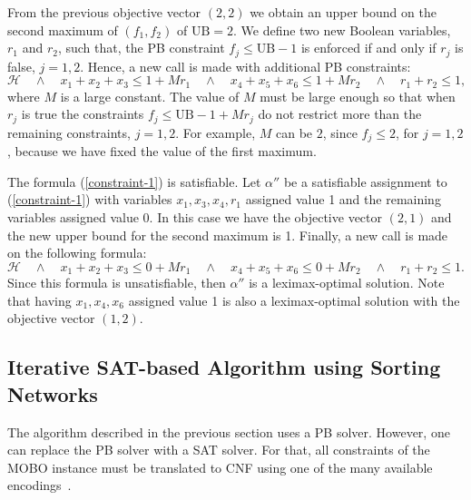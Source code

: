 \documentclass[a4paper,UKenglish,cleveref, autoref, thm-restate]{lipics-v2021}
\newcommand{\UB}{\text{UB}}
\begin{document}
\begin{example}
\begin{equation*}
\end{equation*}
From the previous objective vector $(2,2)$ we obtain an upper bound on the second maximum of $(f_1,f_2)$ of $\UB = 2$.
We define two new Boolean variables, $r_1$ and $r_2$, such that, the PB constraint $f_j \leq \UB - 1$ is enforced if and only if $r_j$ is false, $j=1,2$.
Hence, a new call is made with additional PB constraints:
\begin{equation}
    \mathcal{H} \quad \wedge \quad
    x_1 + x_2 + x_3 \leq 1 + M r_1 \quad \wedge \quad
    x_4 + x_5 + x_6 \leq 1 + M r_2 \quad \wedge \quad
    r_1 + r_2 \leq 1, \label{constraint-1}
\end{equation}
where $M$ is a large constant.
The value of $M$ must be large enough so that when $r_j$ is true the constraints $f_j \leq \UB - 1 + M r_j$ do not restrict more than the remaining constraints, $j=1,2$.
For example, $M$ can be $2$, since $f_j \leq 2$, for $j=1,2$, because we have fixed the value of the first maximum.

The formula (\ref{constraint-1}) is satisfiable. Let $\alpha''$ be a satisfiable
assignment to (\ref{constraint-1}) with variables $x_1, x_3, x_4, r_1$ assigned value 1 and the remaining variables assigned value 0. In this case we have the objective vector $(2,1)$ and the new upper bound for the second maximum is 1.
Finally, a new call is made on the following formula:
\begin{equation*}
    \mathcal{H} \quad \wedge \quad
    x_1 + x_2 + x_3 \leq 0 + M r_1 \quad \wedge \quad
    x_4 + x_5 + x_6 \leq 0 + M r_2 \quad \wedge \quad
    r_1 + r_2 \leq 1.
\end{equation*}
Since this formula is unsatisfiable, then $\alpha''$ is a leximax-optimal solution.
Note that having $x_1, x_4, x_6$ assigned value 1 is also a leximax-optimal solution with the objective vector $(1, 2)$.

\end{example}
 
\subsection{Iterative SAT-based Algorithm using Sorting Networks}
\label{sec:itersat}

The algorithm described in the previous section uses a PB solver. However, 
one can replace the PB solver with a SAT solver. For that, all constraints of the MOBO instance must be translated to CNF using one of the many available encodings~\cite{bailleux-cp03,seq,asin-constraints11,totalizer-ictai13,swc,watchdog,bailleux-jsat06,DBLP:journals/jsat/EenS06,abio-jair12}.
\end{document}
